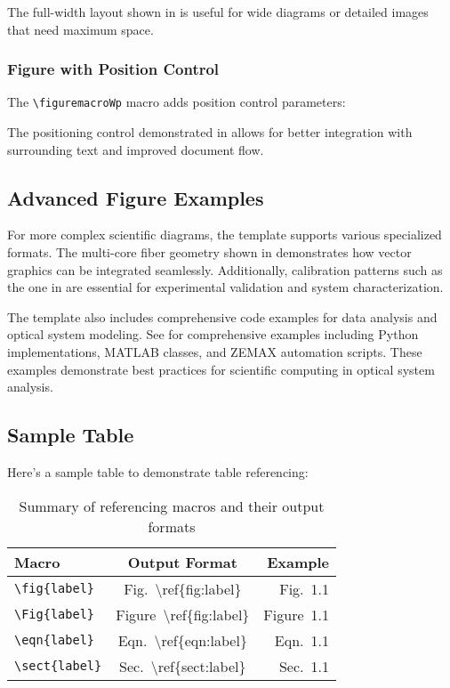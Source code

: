 The full-width layout shown in  is useful for wide diagrams or detailed images that need maximum space.

\subsubsection{Figure with Position Control}
The \texttt{\textbackslash figuremacroWp} macro adds position control parameters:


The positioning control demonstrated in  allows for better integration with surrounding text and improved document flow.

\subsection{Advanced Figure Examples}
\label{sect:advancedfigs}

For more complex scientific diagrams, the template supports various specialized formats. The multi-core fiber geometry shown in  demonstrates how vector graphics can be integrated seamlessly. Additionally, calibration patterns such as the one in  are essential for experimental validation and system characterization.

The template also includes comprehensive code examples for data analysis and optical system modeling. See  for comprehensive examples including Python implementations, MATLAB classes, and ZEMAX automation scripts. These examples demonstrate best practices for scientific computing in optical system analysis.

\subsection{Sample Table}
\label{sect:sampletable}

Here's a sample table to demonstrate table referencing:

\begin{table}[h]
\centering
\begin{tabular}{|l|c|r|}
\hline
\textbf{Macro} & \textbf{Output Format} & \textbf{Example} \\
\hline
\texttt{\textbackslash fig\{label\}} & Fig.~\textbackslash ref\{fig:label\} & Fig.~1.1 \\
\texttt{\textbackslash Fig\{label\}} & Figure~\textbackslash ref\{fig:label\} & Figure~1.1 \\
\texttt{\textbackslash eqn\{label\}} & Eqn.~\textbackslash ref\{eqn:label\} & Eqn.~1.1 \\
\texttt{\textbackslash sect\{label\}} & Sec.~\textbackslash ref\{sect:label\} & Sec.~1.1 \\
\hline
\end{tabular}
\caption{Summary of referencing macros and their output formats}
\label{tabl:sampletable}
\end{table}

